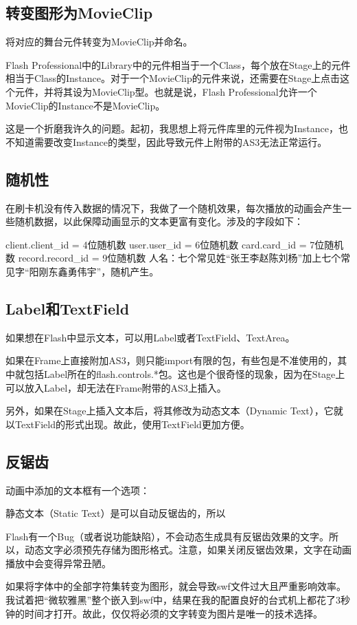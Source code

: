 \subsection{转变图形为MovieClip}
将对应的舞台元件转变为MovieClip并命名。

Flash Professional中的Library中的元件相当于一个Class，每个放在Stage上的元件相当于Class的Instance。对于一个MovieClip的元件来说，还需要在Stage上点击这个元件，并将其设为MovieClip型。也就是说，Flash Professional允许一个MovieClip的Instance不是MovieClip。

这是一个折磨我许久的问题。起初，我思想上将元件库里的元件视为Instance，也不知道需要改变Instance的类型，因此导致元件上附带的AS3无法正常运行。

\subsection{随机性}
在刷卡机没有传入数据的情况下，我做了一个随机效果，每次播放的动画会产生一些随机数据，以此保障动画显示的文本更富有变化。涉及的字段如下：

client.client\_id = 4位随机数
user.user\_id = 6位随机数
card.card\_id = 7位随机数
record.record\_id = 9位随机数
人名：七个常见姓“张王李赵陈刘杨”加上七个常见字“阳刚东鑫勇伟宇”，随机产生。

\subsection{Label和TextField}
如果想在Flash中显示文本，可以用Label或者TextField、TextArea。

如果在Frame上直接附加AS3，则只能import有限的包，有些包是不准使用的，其中就包括Label所在的flash.controls.*包。这也是个很奇怪的现象，因为在Stage上可以放入Label，却无法在Frame附带的AS3上插入。

另外，如果在Stage上插入文本后，将其修改为动态文本（Dynamic Text），它就以TextField的形式出现。故此，使用TextField更加方便。

\subsection{反锯齿}
动画中添加的文本框有一个选项：

静态文本（Static Text）是可以自动反锯齿的，所以

Flash有一个Bug（或者说功能缺陷），不会动态生成具有反锯齿效果的文字。所以，动态文字必须预先存储为图形格式。注意，如果关闭反锯齿效果，文字在动画播放中会变得异常丑陋。

如果将字体中的全部字符集转变为图形，就会导致swf文件过大且严重影响效率。我试着把“微软雅黑”整个嵌入到swf中，结果在我的配置良好的台式机上都花了3秒钟的时间才打开。故此，仅仅将必须的文字转变为图片是唯一的技术选择。

